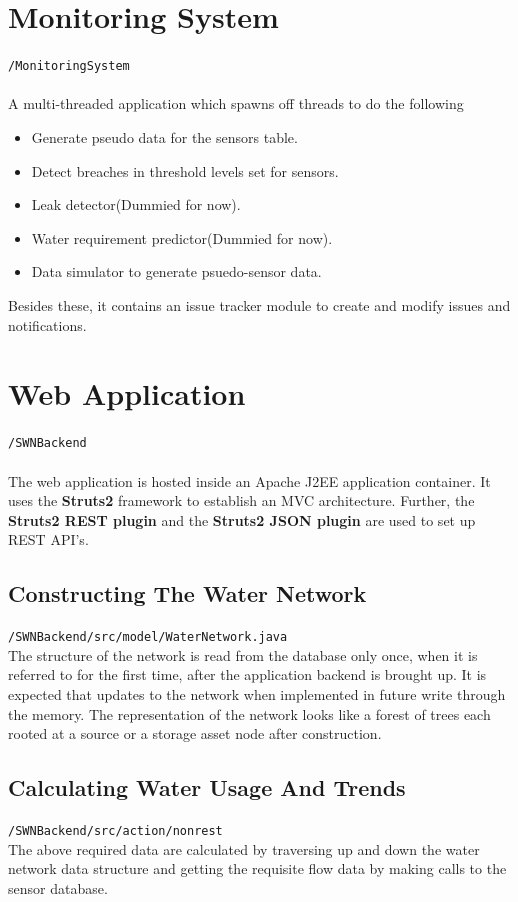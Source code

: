 \documentclass[11pt]{report} %
\begin{document}
\section{Monitoring System}
\texttt{/MonitoringSystem}\\
\\
A multi-threaded application which spawns off threads to do the following
\begin{itemize}
\item Generate pseudo data for the sensors table.
\item Detect breaches in threshold levels set for sensors.
\item Leak detector(Dummied for now).
\item Water requirement predictor(Dummied for now).
\item Data simulator to generate psuedo-sensor data.
\end{itemize}
Besides these, it contains an issue tracker module to create and modify issues and notifications.


\section{Web Application}
\texttt{/SWNBackend} \\
\\
The web application is hosted inside an Apache J2EE application container. It uses the \textbf{ Struts2} framework to establish an MVC architecture. Further, the \textbf{Struts2 REST plugin} and the \textbf{Struts2 JSON plugin} are used to set up REST API's.
\\
\noindent

\subsection{Constructing The Water Network}
\texttt{/SWNBackend/src/model/WaterNetwork.java}
\\
\noindent The structure of the network is read from the database only once, when it is referred to for the first time, after the application backend is brought up. It is expected that updates to the network when implemented in future write through the memory.
\noindent The representation of the network looks like a forest of trees each rooted at a source or a storage asset node after construction.

\subsection{Calculating Water Usage And Trends}
\texttt{/SWNBackend/src/action/nonrest}
\\
\noindent The above required data are calculated by traversing up and down the water network data structure and getting the requisite flow data by making calls to the sensor database.
\end{document}

